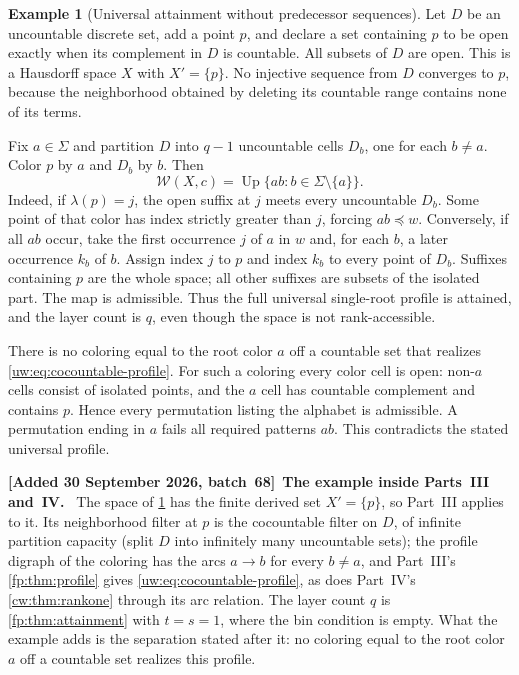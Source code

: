 \documentclass[11pt,letterpaper]{article}
\numberwithin{equation}{section}
\theoremstyle{definition}
\newtheorem{example}[example]{Example}
\theoremstyle{remark}
\theoremstyle{definition}
\newcommand{\W}{\mathcal W}
\newcommand{\subseq}{\preccurlyeq}
\newenvironment{writenotee}[1][]{\par\smallskip\begingroup\small\sloppy
 \noindent\textbf{[Added 30 September 2026, batch~68]}\if\relax\detokenize{#1}\relax\else~\textbf{#1.}\fi\ }%
 {\par\endgroup\smallskip}
\begin{document}
\begin{example}[Universal attainment without predecessor sequences]
\label{uw:ex:cocountable}
Let $D$ be an uncountable discrete set, add a point $p$, and declare a set
containing $p$ to be open exactly when its complement in $D$ is countable.
All subsets of $D$ are open. This is a Hausdorff space $X$ with $X'=\{p\}$.
No injective sequence from $D$ converges to $p$, because the neighborhood
obtained by deleting its countable range contains none of its terms.

Fix $a\in\Sigma$ and partition $D$ into $q-1$ uncountable cells $D_b$, one
for each $b\ne a$. Color $p$ by $a$ and $D_b$ by $b$. Then
\begin{equation}\label{uw:eq:cocountable-profile}
 \W(X,c)=\operatorname{Up}\{ab:b\in\Sigma\setminus\{a\}\}.
\end{equation}
Indeed, if $\lambda(p)=j$, the open suffix at $j$ meets every uncountable
$D_b$. Some point of that color has index strictly greater than $j$, forcing
$ab\subseq w$. Conversely, if all $ab$ occur, take the first occurrence $j$
of $a$ in $w$ and, for each $b$, a later occurrence $k_b$ of $b$. Assign
index $j$ to $p$ and index $k_b$ to every point of $D_b$. Suffixes containing
$p$ are the whole space; all other suffixes are subsets of the isolated part.
The map is admissible. Thus the full universal single-root profile is attained,
and the layer count is $q$, even though the space is not rank-accessible.
\end{example}

There is no coloring equal to the root color $a$ off a countable set that
realizes \eqref{uw:eq:cocountable-profile}. For such a coloring every color cell
is open: non-$a$ cells consist of isolated points, and the $a$ cell has
countable complement and contains $p$. Hence every permutation listing the
alphabet is admissible. A permutation ending in $a$ fails all required
patterns $ab$. This contradicts the stated universal profile.

\begin{writenotee}[The example inside Parts~III and~IV]
The space of \cref{uw:ex:cocountable} has the finite derived set
$X'=\{p\}$, so Part~III applies to it. Its neighborhood filter at $p$ is
the cocountable filter on $D$, of infinite partition capacity (split $D$
into infinitely many uncountable sets); the profile digraph of the coloring
has the arcs $a\to b$ for every $b\ne a$, and Part~III's
\cref{fp:thm:profile} gives \eqref{uw:eq:cocountable-profile}, as does
Part~IV's \cref{cw:thm:rankone} through its arc relation. The layer count
$q$ is \cref{fp:thm:attainment} with $t=s=1$, where the bin condition is
empty. What the example adds is the separation stated after it: no coloring
equal to the root color $a$ off a countable set realizes this profile.
\end{writenotee}
\end{document}
